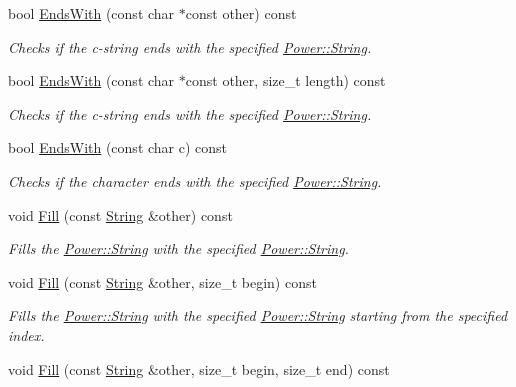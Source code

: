\begin{DoxyCompactItemize}
bool \hyperlink{class_power_1_1_string_a007514d96b8e99416e0c10f6b72675c5}{Ends\+With} (const char $\ast$const other) const
\begin{DoxyCompactList}\small\item\em Checks if the c-\/string ends with the specified \hyperlink{class_power_1_1_string}{Power\+::\+String}. \end{DoxyCompactList}\item 
bool \hyperlink{class_power_1_1_string_a7e5527a7258c8e83f19cc5a353a203b9}{Ends\+With} (const char $\ast$const other, size\+\_\+t length) const
\begin{DoxyCompactList}\small\item\em Checks if the c-\/string ends with the specified \hyperlink{class_power_1_1_string}{Power\+::\+String}. \end{DoxyCompactList}\item 
bool \hyperlink{class_power_1_1_string_a8f4b32bad7099116f14259d2bd0c4004}{Ends\+With} (const char c) const
\begin{DoxyCompactList}\small\item\em Checks if the character ends with the specified \hyperlink{class_power_1_1_string}{Power\+::\+String}. \end{DoxyCompactList}\item 
void \hyperlink{class_power_1_1_string_a6ad45299bb33d665b9536afac8508193}{Fill} (const \hyperlink{class_power_1_1_string}{String} \&other) const
\begin{DoxyCompactList}\small\item\em Fills the \hyperlink{class_power_1_1_string}{Power\+::\+String} with the specified \hyperlink{class_power_1_1_string}{Power\+::\+String}. \end{DoxyCompactList}\item 
void \hyperlink{class_power_1_1_string_a041bb71b50c121cddc1d70120158f358}{Fill} (const \hyperlink{class_power_1_1_string}{String} \&other, size\+\_\+t begin) const
\begin{DoxyCompactList}\small\item\em Fills the \hyperlink{class_power_1_1_string}{Power\+::\+String} with the specified \hyperlink{class_power_1_1_string}{Power\+::\+String} starting from the specified index. \end{DoxyCompactList}\item 
void \hyperlink{class_power_1_1_string_ac403ebc4bbb897d41bc8c141dee83209}{Fill} (const \hyperlink{class_power_1_1_string}{String} \&other, size\+\_\+t begin, size\+\_\+t end) const

\end{DoxyCompactItemize}
